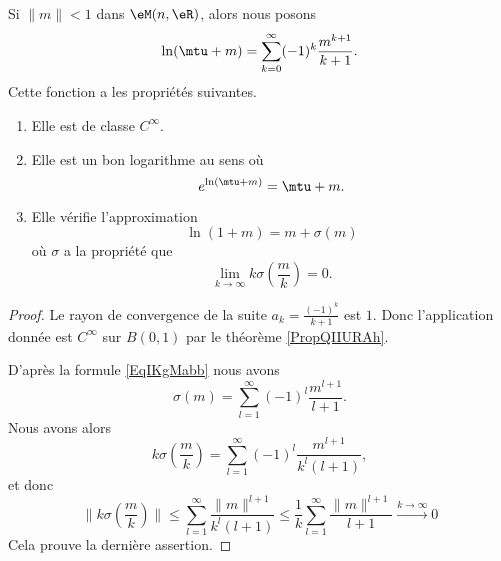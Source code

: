 \begin{lemma}   \label{LemQZIQxaB}
    Si \( \| m \|<1\) dans \( \eM(n,\eR)\), alors nous posons
    \begin{equation}    \label{EqIKgMabb}
        \ln(\mtu+m)=\sum_{k=0}^{\infty}(-1)^k\frac{ m^{k+1} }{ k+1 }.
    \end{equation}
    Cette fonction a les propriétés suivantes.
    \begin{enumerate}
        \item
            Elle est de classe \(  C^{\infty}\).        
        \item
            Elle est un bon logarithme au sens où
            \begin{equation}
                e^{\ln(\mtu+m)}=\mtu+m.
            \end{equation}
        \item
            Elle vérifie l'approximation
            \begin{equation}
                \ln(1+m)=m+\sigma(m)
            \end{equation}
            où \( \sigma\) a la propriété que
            \begin{equation}
                \lim_{k\to \infty} k\sigma\left( \frac{ m }{ k } \right)=0.
            \end{equation}
    \end{enumerate}
\end{lemma}

\begin{proof}
    
    Le rayon de convergence de la suite \( a_k=\frac{ (-1)^k }{ k+1 }\) est \( 1\). Donc l'application donnée est \(  C^{\infty}\) sur \( B(0,1)\) par le théorème \ref{PropQIIURAh}.

    D'après la formule \eqref{EqIKgMabb} nous avons
    \begin{equation}
        \sigma(m)=\sum_{l=1}^{\infty}(-1)^l\frac{ m^{l+1} }{ l+1 }.
    \end{equation}
    Nous avons alors
    \begin{equation}
        k\sigma(\frac{ m }{ k })=\sum_{l=1}^{\infty}(-1)^l\frac{ m^{l+1} }{ k^l(l+1) },
    \end{equation}
    et donc
    \begin{equation}
        \| k\sigma(\frac{ m }{ k }) \|\leq \sum_{l=1}^{\infty}\frac{ \| m \|^{l+1} }{ k^l(l+1) }\leq\frac{1}{ k }\sum_{l=1}^{\infty}\frac{ \| m \|^{l+1} }{ l+1 }\stackrel{k\to\infty}{\to} 0
    \end{equation}
    Cela prouve la dernière assertion.   
\end{proof}

